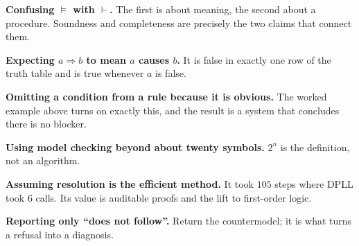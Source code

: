 \begin{pitfall}
\begin{tight}
  \item \textbf{Confusing $\models$ with $\vdash$.} The first is about meaning, the
        second about a procedure. Soundness and completeness are precisely the two
        claims that connect them.
  \item \textbf{Expecting $a \Rightarrow b$ to mean $a$ causes $b$.} It is false in
        exactly one row of the truth table and is true whenever $a$ is false.
  \item \textbf{Omitting a condition from a rule because it is obvious.} The worked
        example above turns on exactly this, and the result is a system that
        concludes there is no blocker.
  \item \textbf{Using model checking beyond about twenty symbols.} $2^{n}$ is the
        definition, not an algorithm.
  \item \textbf{Assuming resolution is the efficient method.} It took $105$ steps
        where DPLL took $6$ calls. Its value is auditable proofs and the lift to
        first-order logic.
  \item \textbf{Reporting only ``does not follow''.} Return the countermodel; it is
        what turns a refusal into a diagnosis.
\end{tight}
\end{pitfall}

